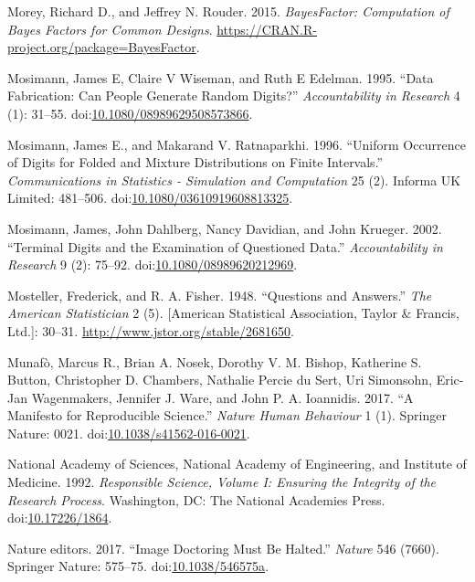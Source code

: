 \documentclass[a5paper]{book}
\begin{document}
\hypertarget{ref-bf}{}
Morey, Richard D., and Jeffrey N. Rouder. 2015. \emph{BayesFactor:
Computation of Bayes Factors for Common Designs}.
\url{https://CRAN.R-project.org/package=BayesFactor}.

\hypertarget{ref-doi:10.1080ux2f08989629508573866}{}
Mosimann, James E, Claire V Wiseman, and Ruth E Edelman. 1995. ``Data
Fabrication: Can People Generate Random Digits?'' \emph{Accountability
in Research} 4 (1): 31--55.
doi:\href{https://doi.org/10.1080/08989629508573866}{10.1080/08989629508573866}.

\hypertarget{ref-doi:10.1080ux2f03610919608813325}{}
Mosimann, James E., and Makarand V. Ratnaparkhi. 1996. ``Uniform
Occurrence of Digits for Folded and Mixture Distributions on Finite
Intervals.'' \emph{Communications in Statistics - Simulation and
Computation} 25 (2). Informa UK Limited: 481--506.
doi:\href{https://doi.org/10.1080/03610919608813325}{10.1080/03610919608813325}.

\hypertarget{ref-doi:10.1080ux2f08989620212969}{}
Mosimann, James, John Dahlberg, Nancy Davidian, and John Krueger. 2002.
``Terminal Digits and the Examination of Questioned Data.''
\emph{Accountability in Research} 9 (2): 75--92.
doi:\href{https://doi.org/10.1080/08989620212969}{10.1080/08989620212969}.

\hypertarget{ref-doi:10.2307ux2f2681650}{}
Mosteller, Frederick, and R. A. Fisher. 1948. ``Questions and Answers.''
\emph{The American Statistician} 2 (5). {[}American Statistical
Association, Taylor \& Francis, Ltd.{]}: 30--31.
\url{http://www.jstor.org/stable/2681650}.

\hypertarget{ref-doi:10.1038ux2fs41562-016-0021}{}
Munafò, Marcus R., Brian A. Nosek, Dorothy V. M. Bishop, Katherine S.
Button, Christopher D. Chambers, Nathalie Percie du Sert, Uri Simonsohn,
Eric-Jan Wagenmakers, Jennifer J. Ware, and John P. A. Ioannidis. 2017.
``A Manifesto for Reproducible Science.'' \emph{Nature Human Behaviour}
1 (1). Springer Nature: 0021.
doi:\href{https://doi.org/10.1038/s41562-016-0021}{10.1038/s41562-016-0021}.

\hypertarget{ref-doi:10.17226ux2f1864}{}
National Academy of Sciences, National Academy of Engineering, and
Institute of Medicine. 1992. \emph{Responsible Science, Volume I:
Ensuring the Integrity of the Research Process}. Washington, DC: The
National Academies Press.
doi:\href{https://doi.org/10.17226/1864}{10.17226/1864}.

\hypertarget{ref-doi:10.1038ux2f546575a}{}
Nature editors. 2017. ``Image Doctoring Must Be Halted.'' \emph{Nature}
546 (7660). Springer Nature: 575--75.
doi:\href{https://doi.org/10.1038/546575a}{10.1038/546575a}.
\end{document}
